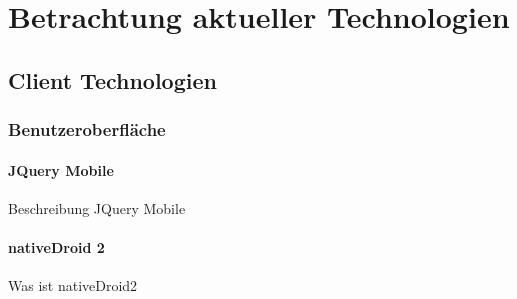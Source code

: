 \section{Betrachtung aktueller Technologien}

\subsection{Client Technologien}

\subsubsection{Benutzeroberfläche}

\paragraph{JQuery Mobile}

Beschreibung JQuery Mobile

\paragraph{nativeDroid 2}

Was ist nativeDroid2